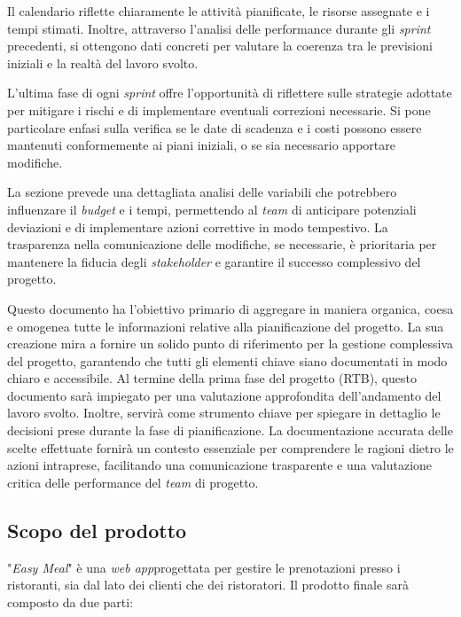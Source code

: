 \begin{itemize}
		Il calendario riflette chiaramente le attività pianificate, le risorse assegnate 
		e i tempi stimati. 
		Inoltre, attraverso l'analisi delle performance durante gli \textit{sprint} precedenti, 
		si ottengono dati concreti per valutare la coerenza tra le previsioni iniziali 
		e la realtà del lavoro svolto.
	
		L'ultima fase di ogni \textit{sprint} offre l'opportunità di riflettere sulle strategie 
		adottate per mitigare i rischi e di implementare eventuali correzioni necessarie. 
		Si pone particolare enfasi sulla verifica se le date di scadenza e i costi possono 
		essere mantenuti conformemente ai piani iniziali, o se sia necessario apportare modifiche.
	
		La sezione prevede una dettagliata analisi delle variabili che potrebbero influenzare 
		il \textit{budget} e i tempi, permettendo al \textit{team} di anticipare potenziali deviazioni e di 
		implementare azioni correttive in modo tempestivo. La trasparenza nella comunicazione 
		delle modifiche, se necessarie, è prioritaria per mantenere la fiducia degli \textit{stakeholder} 
		e garantire il successo complessivo del progetto.
\end{itemize}
Questo documento ha l'obiettivo primario di aggregare in maniera organica, coesa e 
omogenea tutte le informazioni relative alla pianificazione del progetto. 
La sua creazione mira a fornire un solido punto di riferimento per la gestione complessiva del progetto, 
garantendo che tutti gli elementi chiave siano documentati in modo chiaro e accessibile. 
\newline 
Al termine della prima fase del progetto (RTB), questo documento sarà impiegato per una valutazione 
approfondita dell'andamento del lavoro svolto. Inoltre, servirà come strumento chiave per spiegare 
in dettaglio le decisioni prese durante la fase di pianificazione. 
La documentazione accurata delle scelte effettuate fornirà un contesto essenziale per comprendere 
le ragioni dietro le azioni intraprese, facilitando una comunicazione trasparente e una 
valutazione critica delle performance del \textit{team} di progetto.

\subsection{Scopo del prodotto}

"\textit{Easy Meal}" è una \textit{web app}\g progettata per gestire le
prenotazioni presso i ristoranti, sia dal lato dei clienti che dei ristoratori.
Il prodotto finale sarà composto da due parti:

